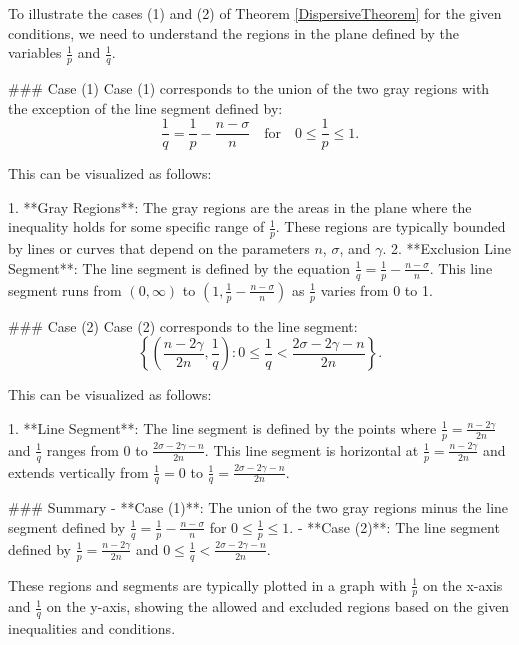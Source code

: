 To illustrate the cases (1) and (2) of Theorem \ref{DispersiveTheorem} for the given conditions, we need to understand the regions in the plane defined by the variables \( \frac{1}{p} \) and \( \frac{1}{q} \).

### Case (1)
Case (1) corresponds to the union of the two gray regions with the exception of the line segment defined by:
\[ \frac{1}{q} = \frac{1}{p} - \frac{n-\sigma}{n} \quad \text{for} \quad 0 \leq \frac{1}{p} \leq 1. \]

This can be visualized as follows:

1. **Gray Regions**: The gray regions are the areas in the plane where the inequality holds for some specific range of \( \frac{1}{p} \). These regions are typically bounded by lines or curves that depend on the parameters \( n \), \( \sigma \), and \( \gamma \).
2. **Exclusion Line Segment**: The line segment is defined by the equation \( \frac{1}{q} = \frac{1}{p} - \frac{n-\sigma}{n} \). This line segment runs from \( \left(0, \infty\right) \) to \( \left(1, \frac{1}{p} - \frac{n-\sigma}{n}\right) \) as \( \frac{1}{p} \) varies from 0 to 1.

### Case (2)
Case (2) corresponds to the line segment:
\[ \left\{ \left( \frac{n-2\gamma}{2n}, \frac{1}{q} \right) : 0 \leq \frac{1}{q} < \frac{2\sigma - 2\gamma - n}{2n} \right\}. \]

This can be visualized as follows:

1. **Line Segment**: The line segment is defined by the points where \( \frac{1}{p} = \frac{n-2\gamma}{2n} \) and \( \frac{1}{q} \) ranges from 0 to \( \frac{2\sigma - 2\gamma - n}{2n} \). This line segment is horizontal at \( \frac{1}{p} = \frac{n-2\gamma}{2n} \) and extends vertically from \( \frac{1}{q} = 0 \) to \( \frac{1}{q} = \frac{2\sigma - 2\gamma - n}{2n} \).

### Summary
- **Case (1)**: The union of the two gray regions minus the line segment defined by \( \frac{1}{q} = \frac{1}{p} - \frac{n-\sigma}{n} \) for \( 0 \leq \frac{1}{p} \leq 1 \).
- **Case (2)**: The line segment defined by \( \frac{1}{p} = \frac{n-2\gamma}{2n} \) and \( 0 \leq \frac{1}{q} < \frac{2\sigma - 2\gamma - n}{2n} \).

These regions and segments are typically plotted in a graph with \( \frac{1}{p} \) on the x-axis and \( \frac{1}{q} \) on the y-axis, showing the allowed and excluded regions based on the given inequalities and conditions.
